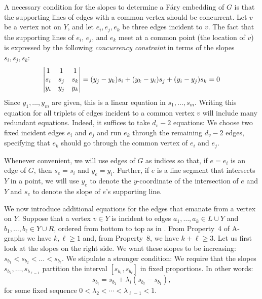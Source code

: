 A necessary condition for the slopes to determine a F\'ary embedding of $G$ is that the supporting lines of edges 
with a common vertex should be concurrent. Let $v$ be a vertex 
not on $Y$, and let $e_i, e_j, e_k$ be three edges incident to $v$.
The fact that the supporting lines of $e_i$, $e_j$, and $e_k$
meet at a common point (the location of $v$) is expressed by the following
\emph{concurrency constraint} in terms of the slopes $s_i,s_j,s_k$:
\begin{equation}\eqlabel{slope0} 
\left|
\begin{matrix}
1&1&1\\
s_i&s_j&s_k\\
y_i&y_j&y_k
\end{matrix}
\right|=
({y_j-y_k}) s_i + ({y_k-y_i}) s_j 
+ ({y_i-y_j})s_k  = 0
\end{equation}
Since $y_1,\ldots,y_m$ are given, this is a linear equation
in $s_1,\ldots,s_m$.
Writing this equation for all triplets of edges incident to a common
vertex $v$ will include many redundant equations. Indeed, it suffices to take $d_v-2$ equations: We choose two fixed
incident edges $e_i$ and $e_j$ and run $e_k$ through the remaining
$d_v-2$ edges, specifying that $e_k$ should go through the common vertex
of $e_i$ and $e_j$.

Whenever convenient, we will use edges of $G$
as indices so that, if $e=e_i$ is an edge of $G$, then $s_e=s_i$
and $y_e=y_i$.  Further, if $e$ is a line segment that
intersects $Y$ in a point, we will use $y_e$ to denote the $y$-coordinate
of the intersection of $e$ and $Y$ and $s_e$ to denote the slope of
$e$'s supporting line.


We now introduce additional equations for the edges that emanate from a
vertex on $Y$.
Suppose that a vertex $v\in Y$ is incident to edges $a_1,\ldots,a_k\in L\cup Y$ 
and $b_1,\ldots,b_\ell\in Y\cup R$, ordered from bottom to top as in .
From Property~4 of A-graphs we have $k,\ell\ge1$ and, from Property~8, we have $k+\ell\ge 3$.
Let us first look at the slopes on the right side.
We want these slopes to be increasing:
$s_{b_1} < s_{b_2} < \dots  <s_{b_\ell}$. We stipulate a stronger
condition:
We require that the slopes
$s_{b_2}, \dots, s_{b_{\ell-1}}$ partition the interval
$[s_{b_1},s_{b_\ell}]$ in fixed proportions. In other words:
\begin{equation}
\label{eq:proportion}
s_{b_i} = s_{b_1} + \lambda_i(s_{b_{\ell}}-s_{b_1}),
\end{equation}
for some fixed sequence $0<\lambda_2<\cdots<\lambda_{\ell-1}<1$.

